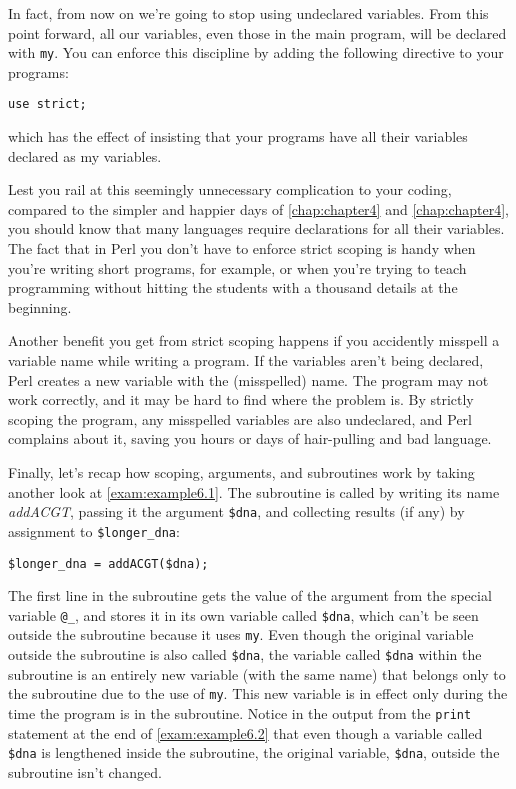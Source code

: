 In fact, from now on we're going to stop using undeclared variables.  From this point forward, all our variables, even those in the main program, will be declared with \verb|my|. You can enforce this discipline by adding the following directive to your programs:

\begin{lstlisting}
use strict;
\end{lstlisting}

which has the effect of insisting that your programs have all their variables declared as my variables.

Lest you rail at this seemingly unnecessary complication to your coding, compared to the simpler and happier days of \autoref{chap:chapter4} and \autoref{chap:chapter4}, you should know that many languages require declarations for all their variables. The fact that in Perl you don't have to enforce strict scoping is handy when you're writing short programs, for example, or when you're trying to teach programming without hitting the students with a thousand details at the beginning.

Another benefit you get from strict scoping happens if you accidently misspell a variable name while writing a program. If the variables aren't being declared, Perl creates a new variable with the (misspelled) name. The program may not work correctly, and it may be hard to find where the problem is. By strictly scoping the program, any misspelled variables are also undeclared, and Perl complains about it, saving you hours or days of hair-pulling and bad language.

Finally, let's recap how scoping, arguments, and subroutines work by taking another look at \autoref{exam:example6.1}. The subroutine is called by writing its name \textit{addACGT}, passing it the argument \verb|$dna|, and collecting results (if any) by assignment to \verb|$longer_dna|:

\begin{lstlisting}
$longer_dna = addACGT($dna); 
\end{lstlisting}

The first line in the subroutine gets the value of the argument from the special variable \verb|@_|, and stores it in its own variable called \verb|$dna|, which can't be seen outside the subroutine because it uses \verb|my|. Even though the original variable outside the subroutine is also called \verb|$dna|, the variable called \verb|$dna| within the subroutine is an entirely new variable (with the same name) that belongs only to the subroutine due to the use of \verb|my|. This new variable is in effect only during the time the program is in the subroutine. Notice in the output from the \verb|print| statement at the end of \autoref{exam:example6.2} that even though a variable called \verb|$dna| is lengthened inside the subroutine, the original variable, \verb|$dna|, outside the subroutine isn't changed. 

